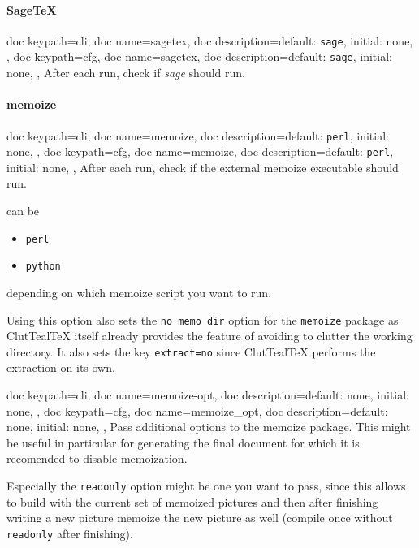 \documentclass[a4paper, 11pt]{scrartcl}
\let\TeXold\TeX
\newcommand\CluttealTeX{ClutTeal\TeX\xspace}
\renewcommand\TeX{\TeXold\xspace}
\begin{document}
\paragraph{Sage\TeX}
\begin{docKeys}[
		doc parameter={=\meta{sagetex}},
	]{
		{
			doc keypath=cli,
			doc name=sagetex,
			doc description={default: \texttt{sage}, initial: none},
		},
		{
			doc keypath=cfg,
			doc name=sagetex,
			doc description={default: \texttt{sage}, initial: none},
		},
	}
	After each run, check if \emph{sage} should run.
\end{docKeys}

\paragraph{memoize}
\begin{docKeys}[
		doc parameter={=\meta{memoize}},
	]{
		{
			doc keypath=cli,
			doc name=memoize,
			doc description={default: \texttt{perl}, initial: none},
		},
		{
			doc keypath=cfg,
			doc name=memoize,
			doc description={default: \texttt{perl}, initial: none},
		},
	}
	After each run, check if the external memoize executable should run.

	 can be
	\begin{multicols}{3}
		\begin{itemize}
			\item \texttt{perl}
			\item \texttt{python}
		\end{itemize}
	\end{multicols}
	depending on which memoize script you want to run.

	Using this option also sets the \texttt{no memo dir} option for the \texttt{memoize} package as \CluttealTeX itself already provides the feature of avoiding to clutter the working directory.
	It also sets the key \texttt{extract=no} since \CluttealTeX performs the extraction on its own.
\end{docKeys}
\begin{docKeys}[
		doc parameter={=\meta{memoize\_opt}},
	]{
		{
			doc keypath=cli,
			doc name=memoize-opt,
			doc description={default: none, initial: none},
		},
		{
			doc keypath=cfg,
			doc name=memoize_opt,
			doc description={default: none, initial: none},
		},
	}
	Pass additional options to the memoize package.
	This might be useful in particular for generating the final document for which it is recomended to disable memoization.

	Especially the \texttt{readonly} option might be one you want to pass, since this allows to build with the current set of memoized pictures and then after finishing writing a new picture memoize the new picture as well (compile once without \texttt{readonly} after finishing).
\end{docKeys}
\end{document}
